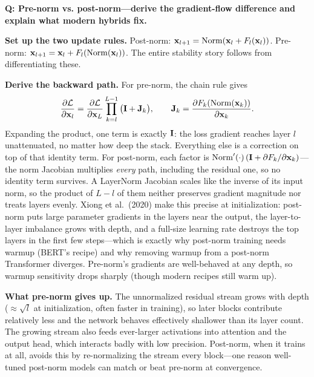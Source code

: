 
\begin{interviewq}
\textbf{Q: Pre-norm vs. post-norm---derive the gradient-flow difference and explain what modern hybrids fix.}

 \quad {} \quad \badgefreq{\freqmed}

\stronganswer

\textbf{Set up the two update rules.} Post-norm: $\mathbf{x}_{l+1} = \mathrm{Norm}(\mathbf{x}_l + F_l(\mathbf{x}_l))$. Pre-norm: $\mathbf{x}_{l+1} = \mathbf{x}_l + F_l(\mathrm{Norm}(\mathbf{x}_l))$. The entire stability story follows from differentiating these.

\textbf{Derive the backward path.} For pre-norm, the chain rule gives
\begin{equation*}
\frac{\partial \mathcal{L}}{\partial \mathbf{x}_l} = \frac{\partial \mathcal{L}}{\partial \mathbf{x}_L}\prod_{k=l}^{L-1}\big(\mathbf{I} + \mathbf{J}_k\big), \qquad \mathbf{J}_k = \frac{\partial F_k(\mathrm{Norm}(\mathbf{x}_k))}{\partial \mathbf{x}_k}.
\end{equation*}
Expanding the product, one term is exactly $\mathbf{I}$: the loss gradient reaches layer $l$ unattenuated, no matter how deep the stack. Everything else is a correction on top of that identity term. For post-norm, each factor is $\mathrm{Norm}'(\cdot)\,(\mathbf{I} + \partial F_k/\partial \mathbf{x}_k)$---the norm Jacobian multiplies \textit{every} path, including the residual one, so no identity term survives. A LayerNorm Jacobian scales like the inverse of its input norm, so the product of $L-l$ of them neither preserves gradient magnitude nor treats layers evenly. Xiong et al.\ (2020) make this precise at initialization: post-norm puts large parameter gradients in the layers near the output, the layer-to-layer imbalance grows with depth, and a full-size learning rate destroys the top layers in the first few steps---which is exactly why post-norm training needs warmup (BERT's recipe) and why removing warmup from a post-norm Transformer diverges. Pre-norm's gradients are well-behaved at any depth, so warmup sensitivity drops sharply (though modern recipes still warm up).

\textbf{What pre-norm gives up.} The unnormalized residual stream grows with depth ($\approx\sqrt{l}$ at initialization, often faster in training), so later blocks contribute relatively less and the network behaves effectively shallower than its layer count. The growing stream also feeds ever-larger activations into attention and the output head, which interacts badly with low precision. Post-norm, when it trains at all, avoids this by re-normalizing the stream every block---one reason well-tuned post-norm models can match or beat pre-norm at convergence.


\end{interviewq}
